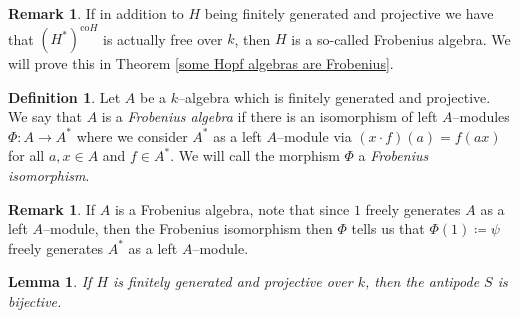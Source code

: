 \documentclass{article}
\theoremstyle{plain}
\newtheorem{Lemma}[Th]{Lemma}
\theoremstyle{definition}
\newtheorem{Def}[Th]{Definition}
\newtheorem{Rem}[Th]{Remark}
\begin{document}
\begin{Rem}
If in addition to $H$ being finitely generated and projective we have that $(H^*)^{\text{co}H}$ is actually free over $k$, then $H$ is a so-called Frobenius algebra. We will prove this in Theorem \ref{some Hopf algebras are Frobenius}.    
\end{Rem}


\begin{Def}\label{Frobenius Algebra}
    Let $A$ be a $k$--algebra which is finitely generated and projective. We say that $A$ is a \textit{Frobenius algebra} if there is an isomorphism of left $A$--modules $\Phi\colon A\to A^*$ where we consider $A^*$ as a left $A$--module via $(x\cdot f)(a)=f(ax)$ for all $a, x\in A$ and $f\in A^*$. We will call the morphism $\Phi$ a \textit{Frobenius isomorphism}.
\end{Def}

\begin{Rem}
    If $A$ is a Frobenius algebra, note that since $1$ freely generates $A$ as a left $A$--module, then the Frobenius isomorphism then $\Phi$ tells us that $\Phi(1)\coloneqq\psi$ freely generates $A^*$ as a left $A$--module.
\end{Rem}

\begin{Lemma}\label{antipode is bijective}
    If $H$ is finitely generated and projective over $k$, then the antipode $S$ is bijective.
\end{Lemma}
\end{document}
